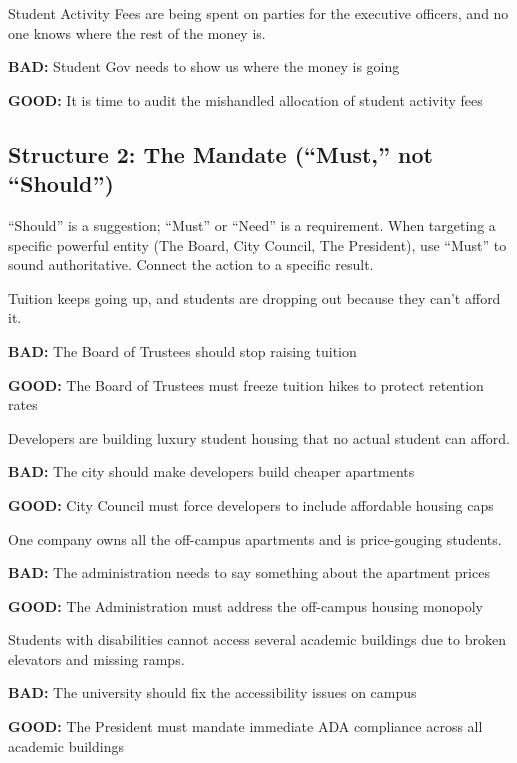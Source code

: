 \documentclass[12pt]{article}
\newcommand{\bad}[1]{\textbf{\textcolor{rose}{BAD:}} #1}
\newcommand{\good}[1]{\textbf{\textcolor{congaree}{GOOD:}} #1}
\newcommand{\context}[1]{#1}
\begin{document}
\begin{exampleblock}
\context{Student Activity Fees are being spent on parties for the executive officers, and no one knows where the rest of the money is.}

\bad{Student Gov needs to show us where the money is going}

\good{It is time to audit the mishandled allocation of student activity fees}
\end{exampleblock}

\newpage
\subsection{Structure 2: The Mandate (``Must,'' not ``Should'')}
``Should'' is a suggestion; ``Must'' or ``Need'' is a requirement. When targeting a specific powerful entity (The Board, City Council, The President), use ``Must'' to sound authoritative. Connect the action to a specific result.

\begin{exampleblock}
\context{Tuition keeps going up, and students are dropping out because they can't afford it.}

\bad{The Board of Trustees should stop raising tuition}

\good{The Board of Trustees must freeze tuition hikes to protect retention rates}
\end{exampleblock}

\begin{exampleblock}
\context{Developers are building luxury student housing that no actual student can afford.}

\bad{The city should make developers build cheaper apartments}

\good{City Council must force developers to include affordable housing caps}
\end{exampleblock}

\begin{exampleblock}
\context{One company owns all the off-campus apartments and is price-gouging students.}

\bad{The administration needs to say something about the apartment prices}

\good{The Administration must address the off-campus housing monopoly}
\end{exampleblock}

\begin{exampleblock}
\context{Students with disabilities cannot access several academic buildings due to broken elevators and missing ramps.}

\bad{The university should fix the accessibility issues on campus}

\good{The President must mandate immediate ADA compliance across all academic buildings}
\end{exampleblock}
\end{document}
